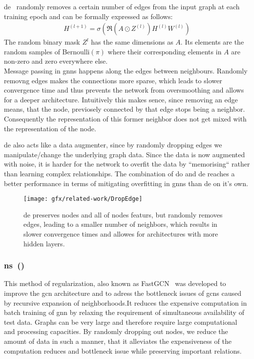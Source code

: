 \ac{de}~\cite{Rong2020} randomly removes a certain number of edges from the input graph at each training epoch and can be formally expressed as follows:
\begin{align*}
    H^{(l+1)} = \sigma(\mathfrak{R}(A \odot Z^{(l)}) H^{(l)} W^{(l)})
\end{align*}
The random binary mask $Z^{l}$ has the same dimensions as $A$.
Its elements are the random samples of Bernoulli$(\pi)$ where their
corresponding elements in $A$ are non-zero and zero everywhere else. \\
Message passing in \acp{gnn} happens along the edges between neighbours.
Randomly removng edges makes the connections more sparse, which
leads to slower convergence time and thus prevents the
network from oversmoothing and allows for a deeper architecture.
Intuitively this makes sence, since removing an edge means, that the node, previosely connected by that edge stops being a neighbor. Consequently the representation of this former neighbor does not get mixed with the representation of the node.

\Ac{de} also acts like a data augmenter, since by randomly dropping edges we manipulate/change the underlying graph data. Since the data is now augmented with noise, it is harder for the network to overfit the data by ``memorising`` rather than learning complex relationships.
The combination of \ac{do} and \ac{de} reaches a better performance in
terms of mitigating overfitting in \acp{gnn} than \ac{de} on it's own.

\begin{figure}[ht]
    \centering
    \texttt{[image: gfx/related-work/DropEdge]}
    \caption{\acf{de} preserves nodes and all of nodes featurs, but randomly removes
        edges, leading to a smaller number of neighbors, which results in slower convergence times and allowes for architectures with more hidden layers.}\label{fig:related:DropEdge}
\end{figure}
\subsubsection{\acl*{ns}~(\citeauthor{Chen2018})}
\label{sec:related:pred:regularization:ns}
This method of regularization, also known as FastGCN~\cite{Chen2018} was
developed to improve the \ac{gcn} \cite{Kipf2017} architecture and to adress the bottleneck issues of \acp{gcn} caused by recursive expansion of neighborhoods.It reduces the expensive computation in batch training of \ac{gnn} by relaxing the requirement of simultaneous availability of test data. Graphs can be very large and therefore require large computational and processing capacities. By randomly dropping out nodes, we reduce the amount of data in such a manner, that it alleviates the expensiveness of the computation reduces and bottleneck issue while preserving important relations.

